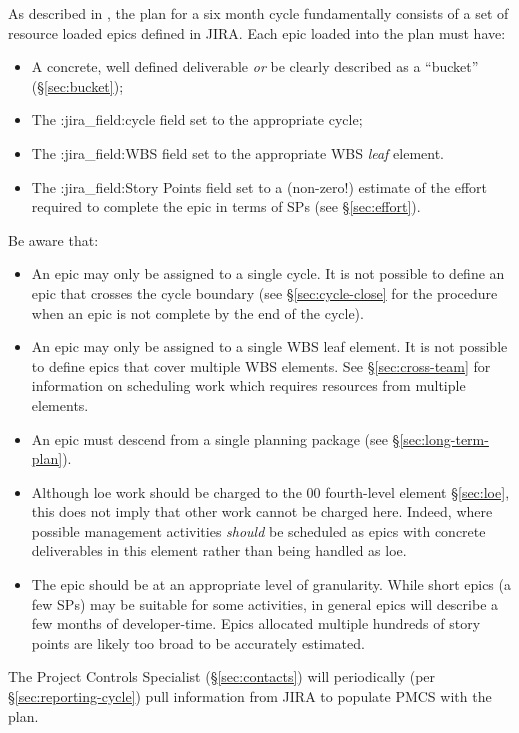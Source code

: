 As described in , the plan for a six month cycle fundamentally consists of a set of resource loaded epics defined in JIRA.
Each epic loaded into the plan must have:

\begin{itemize}
\item
  A concrete, well defined deliverable \emph{or} be clearly described as a ``bucket'' (\S\ref{sec:bucket});
\item
  The :jira\_field:cycle field set to the appropriate cycle;
\item
  The :jira\_field:WBS field set to the appropriate WBS \emph{leaf}
  element.
\item
  The :jira\_field:Story Points field set to a (non-zero!) estimate of the effort required to complete the epic in terms of SPs (see \S\ref{sec:effort}).
\end{itemize}

Be aware that:

\begin{itemize}
\item
  An epic may only be assigned to a single cycle.
  It is not possible to define an epic that crosses the cycle boundary (see \S\ref{sec:cycle-close} for the procedure when an epic is not complete by the end of the cycle).
\item
  An epic may only be assigned to a single WBS leaf element.
  It is not possible to define epics that cover multiple WBS elements.
  See \S\ref{sec:cross-team} for information on scheduling work which requires resources from multiple elements.
\item
  An epic must descend from a single planning package (see \S\ref{sec:long-term-plan}).
\item
  Although \gls{loe} work should be charged to the 00 fourth-level element
  \S\ref{sec:loe}, this does not imply that other work
  cannot be charged here. Indeed, where possible management activities
  \emph{should} be scheduled as epics with concrete deliverables in this
  element rather than being handled as \gls{loe}.
\item
  The epic should be at an appropriate level of granularity. While short
  epics (a few SPs) may be suitable for some activities, in general
  epics will describe a few months of developer-time. Epics allocated
  multiple hundreds of story points are likely too broad to be
  accurately estimated.
\end{itemize}

The Project Controls Specialist (\S\ref{sec:contacts})
will periodically
(per \S\ref{sec:reporting-cycle}) pull information from JIRA to
populate PMCS with the plan.

